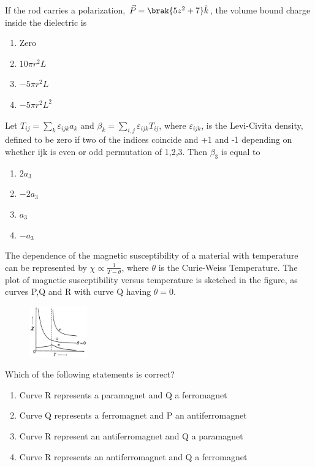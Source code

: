 If the rod carries a polarization, $\vec{P}=\brak{5z^2+7}\hat{k}$, the volume bound charge inside the dielectric is 
    \begin{enumerate}
    	\item Zero
    	\item $10\pi r^2 L$
    	\item $-5\pi r^2 L$
    	\item $-5\pi r^2 L^2$
    \end{enumerate}
    \item Let $T_{ij}=\sum_{k}\varepsilon_{ijk}a_{k}$ and $\beta_{k}=\sum_{i,j}\varepsilon_{ijk}T_{ij}$, where $\varepsilon_{ijk}$, is the Levi-Civita density, defined to be zero if two of the indices coincide and +1 and -1 depending on whether ijk is even or odd permutation of 1,2,3. Then $\beta_{3}$ is equal to
    \begin{enumerate}
    	\item $2a_3$
    	\item $-2a_3$
    	\item $a_3$
    	\item $-a_3$
    \end{enumerate}
    \item The dependence of the magnetic susceptibility \brak{\chi} of a material with temperature  can be represented by $\chi\propto\frac{1}{T-\theta}$, where $\theta$ is the Curie-Weiss Temperature. The plot of magnetic susceptibility versus temperature is sketched in the figure, as curves P,Q and R with curve Q having $\theta=0$.\\
    \begin{figure}[!ht]
    \centering
    \includegraphics[width=2.5cm]{./GATE-yearwise/2009/figs/Q27.png}
    \end{figure}
    \newpage
     Which of the following statements is correct?
    \begin{enumerate}
   	\item Curve R represents a paramagnet and Q a ferromagnet
   	\item Curve Q represents a ferromagnet and P an antiferromagnet
   	\item Curve R represent an antiferromagnet and Q a paramagnet
   	\item Curve R represents an antiferromagnet and Q a ferromagnet
   \end{enumerate}
   
